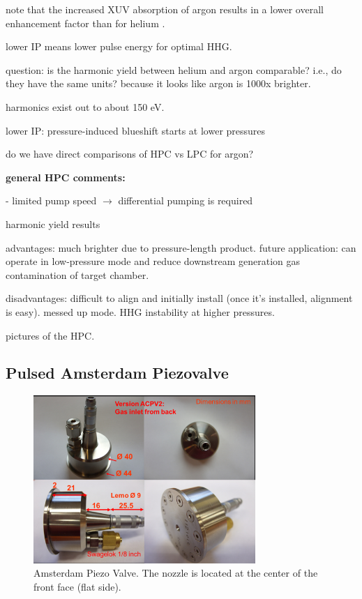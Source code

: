 note that the increased XUV absorption of argon results in a lower overall enhancement factor than for helium \cite{popmintchevPhaseMatchingHigh2009}.

lower IP means lower pulse energy for optimal HHG.

question: is the harmonic yield between helium and argon comparable? i.e., do they have the same units? because it looks like argon is 1000x brighter.


harmonics exist out to about 150 eV.

lower IP: pressure-induced blueshift starts at lower pressures

do we have direct comparisons of HPC vs LPC for argon?




\textbf{general HPC comments:}

- limited pump speed $\rightarrow$ differential pumping is required


harmonic yield results

advantages: much brighter due to pressure-length product. future application: can operate in low-pressure mode and reduce downstream generation gas contamination of target chamber.

disadvantages: difficult to align and initially install (once it's installed, alignment is easy). messed up mode. HHG instability at higher pressures.

pictures of the HPC.



\subsection{Pulsed Amsterdam Piezovalve}

\begin{figure}
	\centering
	\includegraphics[width=0.75\textwidth]{figures/chap3/piezovalve_picture.png}
	\caption{Amsterdam Piezo Valve. The nozzle is located at the center of the front face (flat side).}
	\label{fig:piezovalve_picture}
\end{figure}

